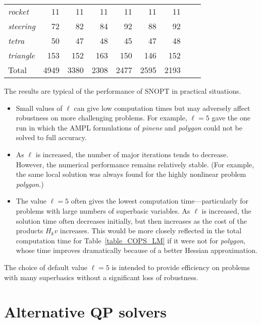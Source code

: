 \documentclass[draft,leqno,onefignum,onetabnum]{siamltex}
\def\strut{\rule[-1.25ex]{0pt}{4ex}}%
\def\strutl{\rule[-1.25ex]{0pt}{3ex}}%
\def\AMPL  {{\small AMPL}}
\def\SNOPT {{\small SNOPT}}
\def\Cute#1{\hbox{\it\lowercase{#1}\/}}
\def\Ampl#1{\hbox{\it#1\/}}
\begin{document}
\begin{table}[p]
\begin{center}
\begin{tabular}{|l|r|r|r|r|r|r|r|r|}
\\             \Cute{rocket}     &    11 &   11 &   11 &   11 &   11 &   11
\\             \Cute{steering}   &    72 &   82 &   84 &   92 &   88 &   92
\\             \Cute{tetra}      &    50 &   47 &   48 &   45 &   47 &   48
\\\strutl      \Cute{triangle}   &   153 &  152 &  163 &  150 &  146 &  152
\\\hline\strut Total             &  4949 & 3380 & 2308 & 2477 & 2595 & 2193
\\\hline
\end{tabular}
\end{center}
\end{table}


The results are typical of the performance of \SNOPT{} in practical
situations.
\begin{itemize}
 \item Small values of $\ell$ can give low computation times but may
adversely affect robustness on more challenging problems.  For
example, $\ell= 5$ gave the one run in which the \AMPL{} formulations of
\Ampl{pinene} and \Ampl{polygon} could not be solved to full accuracy.

\item As $\ell$ is increased, the number of major iterations tends to
decrease. However, the numerical performance remains relatively stable.
(For example, the same local solution was always found for the highly
nonlinear problem {\it polygon}.)

\item The value $\ell= 5$ often gives the lowest computation
time---particularly for problems with large numbers of superbasic
variables.  As $\ell$ is increased, the solution time often
decreases initially, but then increases as the cost of the products
$H_k v$ increases. This would be more closely reflected in the total
computation time for Table~\ref{table_COPS_LM} if it were not for
{\it polygon}, whose time improves dramatically because of a better
Hessian approximation.
\end{itemize}

The choice of default value $\ell = 5$ is intended to provide
efficiency on problems with many superbasics without a significant
loss of robustness.


\section{Alternative QP solvers} \label{sec-future}
\end{document}
